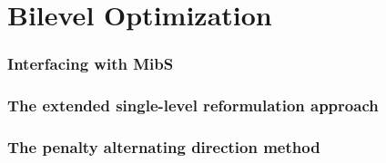 \part{Bilevel Optimization}



\label{chapter:bilevel:continuous}

\section{Interfacing with MibS}
\section{The extended single-level reformulation approach}
\section{The penalty alternating direction method}

